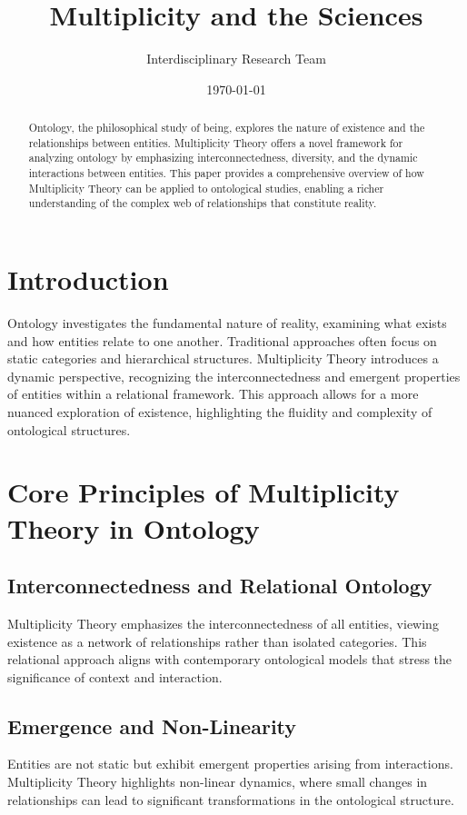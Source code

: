 \documentclass{article}
\title{Multiplicity and the Sciences}
\author{Interdisciplinary Research Team}
\affil{Citizen Gardens - The Foundation of Multiplicity\\info@citizengardens.org}
\date{\today}
\theoremstyle{plain}
\begin{document}
\maketitle

\begin{abstract}
Ontology, the philosophical study of being, explores the nature of existence and the relationships between entities. Multiplicity Theory offers a novel framework for analyzing ontology by emphasizing interconnectedness, diversity, and the dynamic interactions between entities. This paper provides a comprehensive overview of how Multiplicity Theory can be applied to ontological studies, enabling a richer understanding of the complex web of relationships that constitute reality.
\end{abstract}

\section{Introduction}
Ontology investigates the fundamental nature of reality, examining what exists and how entities relate to one another. Traditional approaches often focus on static categories and hierarchical structures. Multiplicity Theory introduces a dynamic perspective, recognizing the interconnectedness and emergent properties of entities within a relational framework. This approach allows for a more nuanced exploration of existence, highlighting the fluidity and complexity of ontological structures.

\section{Core Principles of Multiplicity Theory in Ontology}

\subsection{Interconnectedness and Relational Ontology}
Multiplicity Theory emphasizes the interconnectedness of all entities, viewing existence as a network of relationships rather than isolated categories. This relational approach aligns with contemporary ontological models that stress the significance of context and interaction.

\subsection{Emergence and Non-Linearity}
Entities are not static but exhibit emergent properties arising from interactions. Multiplicity Theory highlights non-linear dynamics, where small changes in relationships can lead to significant transformations in the ontological structure.
\end{document}
